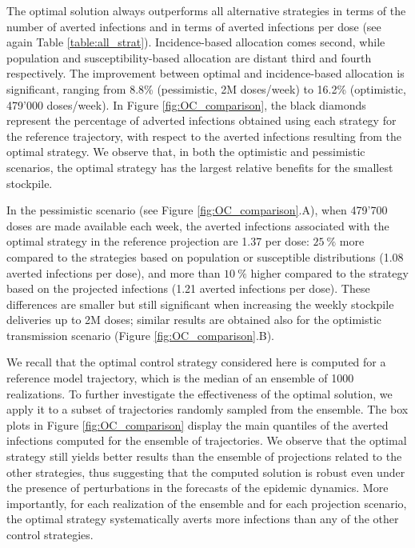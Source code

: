 The optimal solution always outperforms all alternative strategies in terms of the number of averted infections and in terms of averted infections per dose (see again Table \ref{table:all_strat}). Incidence-based allocation comes second, while population and susceptibility-based allocation are distant third and fourth respectively. The improvement between optimal and incidence-based allocation is significant, ranging from 8.8\% (pessimistic, 2M doses/week) to 16.2\% (optimistic, 479'000 doses/week). In Figure \ref{fig:OC_comparison}, the black diamonds represent the percentage of adverted infections obtained using each strategy for the reference trajectory, with respect to the averted infections resulting from the optimal strategy. We observe that, in both the optimistic and pessimistic scenarios, the optimal strategy has the largest relative benefits for the smallest stockpile. 

In the pessimistic scenario (see Figure \ref{fig:OC_comparison}.A), when 479'700 doses are made available each week, the averted infections associated with the optimal strategy in the reference projection are 1.37 per dose: $25~\%$ more compared to the strategies based on population or susceptible distributions (1.08 averted infections per dose), and more than $10~\%$ higher compared to the strategy based on the projected infections (1.21 averted infections per dose). These differences are smaller but still significant when increasing the weekly stockpile deliveries up to 2M doses; similar results are obtained also for the optimistic transmission scenario (Figure \ref{fig:OC_comparison}.B). 

We recall that the optimal control strategy considered here is computed for a reference model trajectory, which is the median of an ensemble of 1000 realizations. To further investigate the effectiveness of the optimal solution, we apply it to a subset of trajectories randomly sampled from the ensemble. The box plots in Figure \ref{fig:OC_comparison} display the main quantiles of the averted infections computed for the ensemble of trajectories. We observe that the optimal strategy still yields better results than the ensemble of projections related to the other strategies, thus suggesting that the computed solution is robust even under the presence of perturbations in the forecasts of the epidemic dynamics. More importantly, for each realization of the ensemble and for each projection scenario, the optimal strategy systematically averts more infections than any of the other control strategies.

